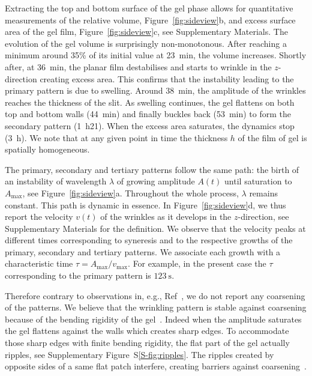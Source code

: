 \documentclass[twocolumn,superscriptaddress,showpacs,preprintnumbers, amsmath,amssymb,prl]{revtex4-1}
\begin{document}
Extracting the top and bottom surface of the gel phase allows for quantitative measurements of the relative volume, Figure~\ref{fig:sideview}b, and excess surface area of the gel film, Figure~\ref{fig:sideview}c, see Supplementary Materials. The evolution of the gel volume is surprisingly non-monotonous. After reaching a minimum around 35\% of its initial value at \SI{23}{\minute}, the volume increases. Shortly after, at \SI{36}{\minute}, the planar film destabilises and starts to wrinkle in the $z$-direction creating excess area. This confirms that the instability leading to the primary pattern is due to swelling. Around \SI{38}{\minute}, the amplitude of the wrinkles reaches the thickness of the slit. As swelling continues, the gel flattens on both top and bottom walls (\SI{44}{\minute}) and finally buckles back (\SI{53}{\minute}) to form the secondary pattern (\SI{1}{\hour}21). When the excess area saturates, the dynamics stop (\SI{3}{\hour}). We note that at any given point in time the thickness $h$ of the film of gel is spatially homogeneous.

The primary, secondary and tertiary patterns follow the same path: the birth of an instability of wavelength $\lambda$ of growing amplitude $A(t)$ until saturation to $A_\text{max}$, see Figure~\ref{fig:sideview}a. Throughout the whole process, $\lambda$ remains constant. This path is dynamic in essence. In Figure~\ref{fig:sideview}d, we thus report the velocity $v(t)$ of the wrinkles as it develops in the $z$-direction, see Supplementary Materials for the definition. We observe that the velocity peaks at different times corresponding to syneresis and to the respective growths of the primary, secondary and tertiary patterns. We associate each growth with a characteristic time $\tau = A_\text{max}/v_\text{max}$. For example, in the present case the $\tau$ corresponding to the primary pattern is $\SI{123}{\second}$.

Therefore contrary to observations in, e.g., Ref~\cite{Yoo2003}, we do not report any coarsening of the patterns. We believe that the wrinkling pattern is stable against coarsening because of the bending rigidity of the gel~\cite{LeGoff2014}. Indeed when the amplitude saturates the gel flattens against the walls which creates sharp edges. To accommodate those sharp edges with finite bending rigidity, the flat part of the gel actually ripples, see Supplementary Figure~S\ref{S-fig:ripples}. The ripples created by opposite sides of a same flat patch interfere, creating barriers against coarsening~\cite{LeGoff2014}.
\end{document}
